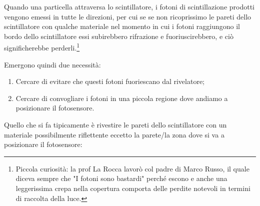 Quando una particella attraversa lo scintillatore, i fotoni di scintillazione prodotti vengono emessi in tutte le direzioni, per cui se se non ricoprissimo le pareti dello scintillatore con qualche materiale nel momento in cui i fotoni raggiungono il bordo dello scintillatore essi subirebbero rifrazione e fuoriuscirebbero, e ciò significherebbe perderli.\footnote{Piccola curiosità: la prof La Rocca lavorò col padre di Marco Russo, il quale diceva sempre che "I fotoni sono bastardi" perché escono e anche una leggerissima crepa nella copertura comporta delle perdite notevoli in termini di raccolta della luce.}

Emergono quindi due necessità:

\begin{enumerate}[leftmargin=0.6cm]
   \item Cercare di evitare che questi fotoni fuoriescano dal rivelatore;
   \item Cercare di convogliare i fotoni in una piccola regione dove andiamo a posizionare il fotosensore.
\end{enumerate}

Quello che si fa tipicamente è rivestire le pareti dello scintillatore con un materiale possibilmente riflettente eccetto la parete/la zona dove si va a posizionare il fotosensore:

\begin{figure}[H]
   \centering
\end{figure}

